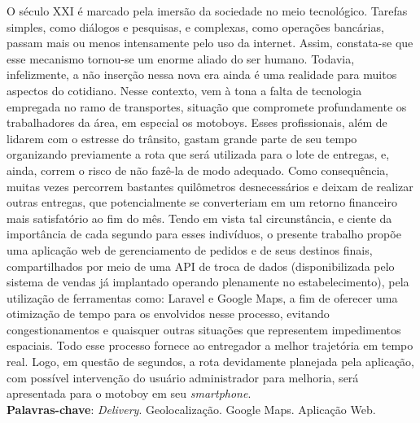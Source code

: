 
\begin{resumo}[RESUMO]
\begin{SingleSpacing}


O século XXI é marcado pela imersão da sociedade no meio tecnológico. Tarefas simples, como diálogos e pesquisas, e complexas, como operações bancárias, passam mais ou menos intensamente pelo uso da internet. Assim, constata-se que esse mecanismo tornou-se um enorme aliado do ser humano. Todavia, infelizmente, a não inserção nessa nova era ainda é uma realidade para muitos aspectos do cotidiano. Nesse contexto, vem à tona a falta de tecnologia empregada no ramo de transportes, situação que compromete profundamente os trabalhadores da área, em especial os motoboys. Esses profissionais, além de lidarem com o estresse do trânsito, gastam grande parte de seu tempo organizando previamente a rota que será utilizada para o lote de entregas, e, ainda, correm o risco de não fazê-la de modo adequado. Como consequência, muitas vezes percorrem bastantes quilômetros desnecessários e deixam de realizar outras entregas, que potencialmente se converteriam em um retorno financeiro mais satisfatório ao fim do mês. Tendo em vista tal circunstância, e ciente da importância de cada segundo para esses indivíduos, o presente trabalho propõe uma aplicação web de gerenciamento de pedidos e de seus destinos finais, compartilhados por meio de uma API de troca de dados (disponibilizada pelo sistema de vendas já implantado operando plenamente no estabelecimento), pela utilização de ferramentas como: Laravel e Google Maps, a fim de oferecer uma otimização de tempo para os envolvidos nesse processo, evitando congestionamentos e quaisquer outras situações que representem impedimentos espaciais. Todo esse processo fornece ao entregador a melhor trajetória em tempo real. Logo, em questão de segundos, a rota devidamente planejada pela aplicação, com possível intervenção do usuário administrador para melhoria, será apresentada para o motoboy em seu \textit{smartphone}.\\

\textbf{Palavras-chave}: \textit{Delivery}. Geolocalização. Google Maps. Aplicação Web.

\end{SingleSpacing}
\end{resumo}
